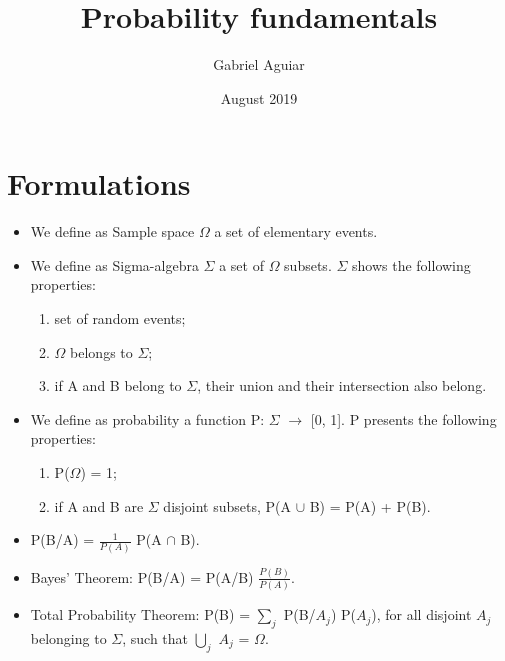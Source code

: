 \documentclass{article}
\title{Probability fundamentals}
\author{Gabriel Aguiar}
\date{August 2019}
\begin{document}
\maketitle

\section{Formulations}

\begin{itemize}
    
\item We define as Sample space $\Omega$ a set of elementary events.
        
\item We define as Sigma-algebra $\Sigma$ a set of $\Omega$ subsets. $\Sigma$ shows the following properties:
\begin{enumerate}
    \item set of random events;
    \item $\Omega$ belongs to $\Sigma$;
    \item if A and B belong to $\Sigma$, their union and their intersection also belong.
\end{enumerate}

\item We define as probability a function P: $\Sigma$ $\rightarrow$ [0, 1]. P presents the following properties: 
\begin{enumerate}
\item P($\Omega$) = 1; 
\item if A and B are $\Sigma$ disjoint subsets, P(A $\cup$ B) = P(A) + P(B).
\end{enumerate}

\item P(B/A) = $\frac{1}{P(A)}$ P(A $\cap$ B).

\item Bayes' Theorem: P(B/A) = P(A/B) $\frac{P(B)}{P(A)}$.

\item Total Probability Theorem: P(B) = $\sum\limits_{j}$ P(B/$A_{j}$) P($A_{j}$), for all disjoint $A_{j}$ belonging to $\Sigma$, such that $\bigcup\limits_{j}$ $A_{j}$ = $\Omega$.



        
\end{itemize}
\end{document}
